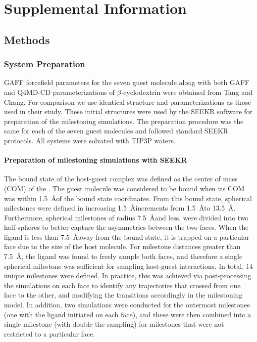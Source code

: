 
\section{Supplemental Information}

\subsection{Methods}
\subsubsection{System Preparation}
\par GAFF\cite{Wang2004,Wang2006} forcefield parameters for the seven guest molecule
along with both GAFF and Q4MD-CD\cite{Cezard2011} parameterizations of $\beta$-cyclodextrin
were obtained from Tang and Chang\cite{Tang2017}. For comparison we use identical structure and
parameterizations as those used in their study. These initial structures were
used by the SEEKR software for preparation of the milestoning simulations.
The preparation procedure was the same for each of the seven guest molecules and
followed standard SEEKR protocols\cite{Votapka2017}. All systems were solvated
with TIP3P waters\cite{Jorgensen1983a}.

\paragraph{Preparation of milestoning simulations with SEEKR}
\par The bound state of the host-guest complex was defined as the center of mass (COM)
of the \bcd. The guest molecule was considered to be bound when
its COM was within 1.5~\AA of the bound state coordinates. From this bound state,
spherical milestones were defined in increasing 1.5~\AA increments from 1.5~\AA to
13.5~\AA. Furthermore, spherical milestones of radius 7.5~\AA and less, were
divided into two half-spheres to better capture the asymmetries between the two faces.
When the ligand is less than 7.5~\AA away from the bound state, it is trapped on
a particular face due to the size of the host molecule. For milestone distances
greater than 7.5~\AA, the ligand was found to freely sample both faces, and therefore
a single spherical milestone was sufficient for sampling host-guest interactions.
In total, 14 unique milestones were defined. In practice, this was achieved via
post-processing the simulations on each face to identify any trajectories that
crossed from one face to the other, and modifying the transitions accordingly in
the milestoning model. In addition, two simulations were conducted for the outermost
milestones (one with the ligand initiated on each face), and these were then
combined into a single milestone (with double the sampling) for milestones that
were not restricted to a particular face.


